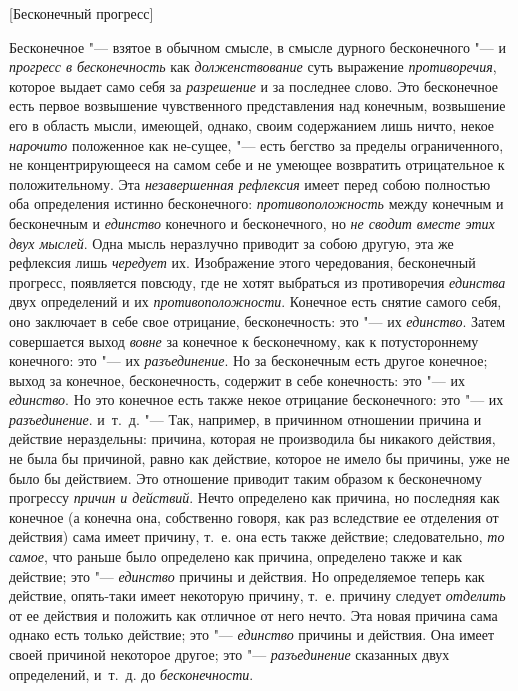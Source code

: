 %
  {[Бесконечный прогресс]}

Бесконечное "--- взятое в обычном смысле, в смысле дурного бесконечного "--- и
{\em прогресс в бесконечность} как {\em долженствование} суть выражение
{\em противоречия}, которое выдает само себя за
{\em разрешение} и за последнее слово. Это бесконечное
есть первое возвышение чувственного представления над конечным, возвышение
его в область мысли, имеющей, однако, своим содержанием лишь ничто, некое
{\em нарочито} положенное как не-сущее, "--- есть бегство
за пределы ограниченного, не концентрирующееся на самом себе и не умеющее
возвратить отрицательное к положительному. Эта
{\em незавершенная рефлексия} имеет перед собою
полностью оба определения истинно бесконечного:
{\em противоположность} между конечным и бесконечным и
{\em единство} конечного и бесконечного, но
{\em не сводит вместе этих двух мыслей}. Одна мысль
неразлучно приводит за собою другую, эта же рефлексия лишь
{\em чередует} их. Изображение этого чередования,
бесконечный прогресс, появляется повсюду, где не хотят выбраться из
противоречия {\em единства} двух определений и их
{\em противоположности}. Конечное есть снятие самого
себя, оно заключает в себе свое отрицание, бесконечность: это "--- их
{\em единство}. Затем совершается выход
{\em вовне} за конечное к бесконечному, как к
потустороннему конечного: это "--- их {\em разъединение}.
Но за бесконечным есть другое конечное; выход за конечное, бесконечность,
содержит в себе конечность: это "--- их {\em единство}. Но
это конечное есть также некое отрицание бесконечного: это "--- их
{\em разъединение}. и~т.~д. "--- Так, например, в
причинном отношении причина и действие нераздельны: причина, которая не
производила бы никакого действия, не была бы причиной, равно как действие,
которое не имело бы причины, уже не было бы действием. Это отношение
приводит таким образом к бесконечному прогрессу
{\em причин и действий}. Нечто определено как причина,
но последняя как конечное (а конечна она, собственно говоря, как раз
вследствие ее отделения от действия) сама имеет причину, т.~е. она есть
также действие; следовательно, {\em то самое}, что
раньше было определено как причина, определено также и как действие; это
"--- {\em единство} причины и действия. Но определяемое
теперь как действие, опять-таки имеет некоторую причину, т.~е. причину
следует {\em отделить} от ее действия и положить как
отличное от него нечто. Эта новая причина сама однако есть только действие;
это "--- {\em единство} причины и действия. Она имеет
своей причиной некоторое другое; это
"--- {\em разъединение} сказанных двух определений,
и~т.~д. до {\em бесконечности}.

